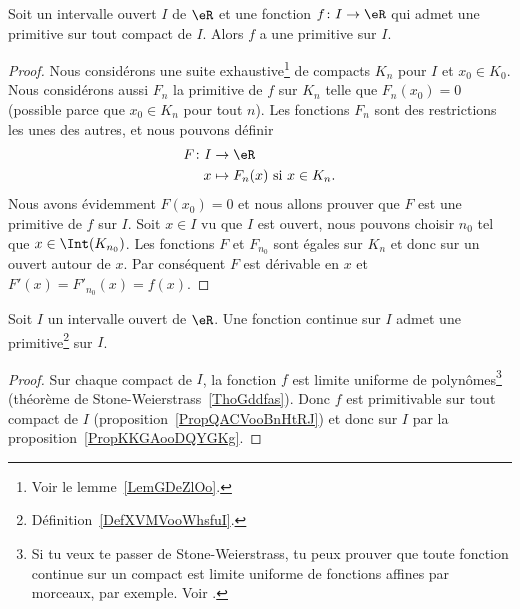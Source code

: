 \begin{proposition}        \label{PropKKGAooDQYGKg}
    Soit un intervalle ouvert \( I\) de \( \eR\) et une fonction \( f\colon I\to \eR\) qui admet une primitive sur tout compact de \( I\). Alors \( f\) a une primitive sur \( I\).
\end{proposition}

\begin{proof}
    Nous considérons une suite exhaustive\footnote{Voir le lemme~\ref{LemGDeZlOo}.} de compacts \( K_n\) pour \( I\) et \( x_0\in K_0\). Nous considérons aussi \( F_n\) la primitive de \( f\) sur \( K_n\) telle que \( F_n(x_0)=0\) (possible parce que \( x_0\in K_n\) pour tout \( n\)). Les fonctions \( F_n\) sont des restrictions les unes des autres, et nous pouvons définir
    \begin{equation}
        \begin{aligned}
            F\colon I&\to \eR \\
            x&\mapsto F_n(x)\text{ si } x\in K_n.
        \end{aligned}
    \end{equation}
    Nous avons évidemment \( F(x_0)=0\) et nous allons prouver que \( F\) est une primitive de \( f\) sur \( I\). Soit \( x\in I\) vu que \( I\) est ouvert, nous pouvons choisir \( n_0\) tel que \( x\in\Int(K_{n_0})\). Les fonctions \( F\) et \( F_{n_0}\) sont égales sur \( K_n\) et donc sur un ouvert autour de \( x\). Par conséquent \( F\) est dérivable en \( x\) et \( F'(x)=F'_{n_0}(x)=f(x)\).
\end{proof}

\begin{theorem}    \label{ThoEXXyooCLwgQg}
    Soit \( I\) un intervalle ouvert de \( \eR\). Une fonction continue sur \( I\) admet une primitive\footnote{Définition~\ref{DefXVMVooWhsfuI}.} sur \( I\).
\end{theorem}

\begin{proof}
    Sur chaque compact de \( I\), la fonction \( f\) est limite uniforme de polynômes\footnote{Si tu veux te passer de Stone-Weierstrass, tu peux prouver que toute fonction continue sur un compact est limite uniforme de fonctions affines par morceaux, par exemple. Voir \cite{MQKDooSuEGxk}.} (théorème de Stone-Weierstrass~\ref{ThoGddfas}). Donc \( f\) est primitivable sur tout compact de \( I\) (proposition~\ref{PropQACVooBnHtRJ}) et donc sur \( I\) par la proposition~\ref{PropKKGAooDQYGKg}.
\end{proof}

